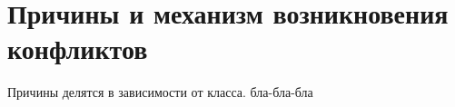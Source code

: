 \chapter{Причины и механизм возникновения конфликтов}

Причины делятся в зависимости от класса.
 бла-бла-бла
